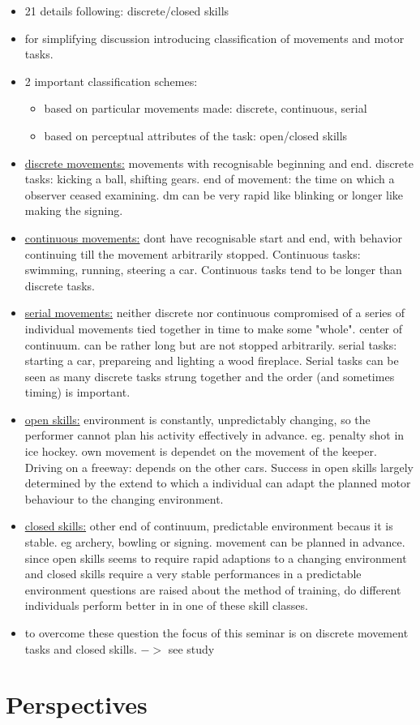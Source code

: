 \begin{itemize}
	\item 21 details following: discrete/closed skills
	\item for simplifying discussion introducing classification of movements and motor tasks.
	\item 2 important classification schemes:
	\begin{itemize}
		\item based on particular movements made: discrete, continuous, serial
		\item based on perceptual attributes of the task: open/closed skills
	\end{itemize}
	\item \underline{discrete movements:} movements with recognisable beginning and end. discrete tasks: kicking a ball, shifting gears. end of movement: the time on which a observer ceased examining. dm can be very rapid like blinking or longer like making the signing.
	\item \underline{continuous movements:} dont have recognisable start and end, with behavior continuing till the movement arbitrarily stopped. Continuous tasks: swimming, running, steering a car. Continuous tasks tend to be longer than discrete tasks.
	\item \underline{serial movements:} neither discrete nor continuous compromised of a series of individual movements tied together in time to make some "whole". center of continuum. can be rather long but are not stopped arbitrarily. serial tasks: starting a car, prepareing and lighting a wood fireplace. Serial tasks can be seen as many discrete tasks strung together and the order (and sometimes timing) is important.
	\item \underline{open skills:} environment is constantly, unpredictably changing, so the performer cannot plan his activity effectively in advance. eg. penalty shot in ice hockey. own movement is dependet on the movement of the keeper. Driving on a freeway: depends on the other cars. Success in open skills largely determined by the extend to which a individual can adapt the planned motor behaviour to the changing environment.
	\item \underline{closed skills:} other end of continuum, predictable environment becaus it is stable. eg archery, bowling or signing. movement can be planned in advance.
	since open skills  seems to require rapid adaptions to a changing environment and closed skills require a very stable performances in a predictable environment questions are raised about the method of training, do different individuals perform better in in one of these skill classes. 
	\item to overcome these question the focus of this seminar is on discrete movement tasks and closed skills. $->$ see study
\end{itemize}


\section{Perspectives}
